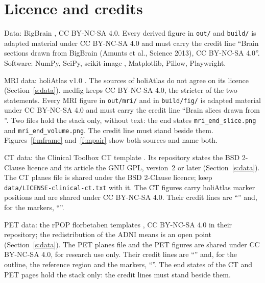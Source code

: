 \documentclass[10pt,a4paper]{article}
\newcommand{\code}[1]{\texttt{#1}}
\begin{document}
\section{Licence and credits}\label{s:licence}
Data: BigBrain \cite{amunts2013}, CC BY-NC-SA 4.0. Every derived figure in \code{out/} and \code{build/} is adapted material under
CC BY-NC-SA 4.0 and must carry the credit line
``Brain sections drawn from BigBrain (Amunts et al., Science 2013), CC BY-NC-SA 4.0''. Software: NumPy, SciPy, scikit-image
\cite{vanderwalt2014}, Matplotlib, Pillow, Playwright.

MRI data: holiAtlas v1.0 \cite{manjon2026}. The sources of holiAtlas do not agree on its licence (Section~\ref{s:data}).
\mbox{medfig} keeps CC BY-NC-SA 4.0, the stricter of the two statements. Every MRI figure in \code{out/mri/} and in
\code{build/fig/} is adapted material under CC BY-NC-SA 4.0 and must carry the credit line
``Brain slices drawn from \mLicense''. Two files hold the stack only, without text: the end states
\nolinkurl{mri_end_slice.png} and \nolinkurl{mri_end_volume.png}. The credit line must stand beside them.
Figures~\ref{f:mframe} and~\ref{f:mpair} show both sources and name both.

CT data: the Clinical Toolbox CT template \cite{rorden2012}. Its repository states the BSD 2-Clause licence and its article the
GNU GPL, version~2 or later (Section~\ref{s:data}). The CT planes file is shared under the BSD 2-Clause licence; keep
\nolinkurl{data/LICENSE-clinical-ct.txt} with it. The CT figures carry holiAtlas marker positions and are shared under
CC BY-NC-SA 4.0. Their credit lines are ``\ctLicense'' and, for the markers, ``\ctMarkerCredit''.

PET data: the rPOP florbetaben templates \cite{iaccarino2022}, CC BY-NC-SA 4.0 in their repository; the redistribution of the
ADNI means is an open point (Section~\ref{s:data}). The PET planes file and the PET figures are shared under CC BY-NC-SA 4.0,
for research use only. Their credit lines are ``\petLicense'' and, for the outline, the reference region and the markers,
``\petOutlineCredit''. The end states of the CT and PET pages hold the stack only: the credit lines must stand beside them.
\end{document}
